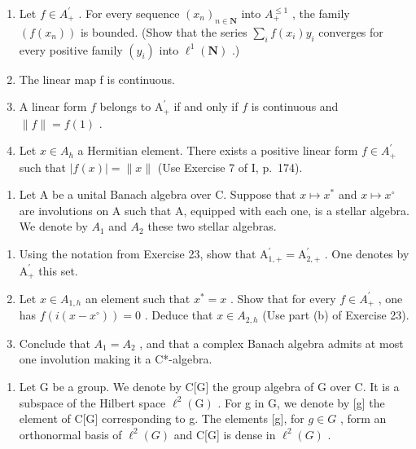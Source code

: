 \begin{enumerate}
\def\labelenumi{\alph{enumi})}
\item
  Let \(f \in A_{+}^{\prime}\) . For every sequence \((x_{n})_{n \in \mathbf{N}}\) into \(A_{+}^{\leqslant 1}\) , the family \((f(x_{n}))\) is bounded. (Show that the series \(\sum_{i} f(x_{i})y_{i}\) converges for every positive family \((y_{i})\) into \(\ell^{1}(\mathbf{N})\) .)
\item
  The linear map f is continuous.
\item
  A linear form \(f\) belongs to \(\mathrm{A}_{+}^{\prime}\) if and only if \(f\) is continuous and \(\| f \| = f(1)\) .
\item
  Let \(x \in A_{h}\) a Hermitian element. There exists a positive linear form \(f \in A_{+}^{\prime}\) such that \(|f(x)| = \|x\|\) (Use Exercise 7 of I, p.~174).
\end{enumerate}

\begin{enumerate}
\def\labelenumi{\arabic{enumi})}
\setcounter{enumi}{23}
\tightlist
\item
  Let A be a unital Banach algebra over C. Suppose that \(x \mapsto x^{*}\) and \(x \mapsto x^{\circ}\) are involutions on A such that A, equipped with each one, is a stellar algebra. We denote by \(A_{1}\) and \(A_{2}\) these two stellar algebras.
\end{enumerate}

\begin{enumerate}
\def\labelenumi{\alph{enumi})}
\item
  Using the notation from Exercise 23, show that \(\mathrm{A}_{1,+}^{\prime} = \mathrm{A}_{2,+}^{\prime}\) . One denotes by \(\mathrm{A}_{+}^{\prime}\) this set.
\item
  Let \(x \in A_{1,h}\) an element such that \(x^{*} = x\) . Show that for every \(f \in A_{+}^{\prime}\) , one has \(f(i(x - x^{\circ})) = 0\) . Deduce that \(x \in A_{2,h}\) (Use part (b) of Exercise 23).
\item
  Conclude that \(A_{1} = A_{2}\) , and that a complex Banach algebra admits at most one involution making it a C*-algebra.
\end{enumerate}

\begin{enumerate}
\def\labelenumi{\arabic{enumi})}
\setcounter{enumi}{24}
\tightlist
\item
  Let G be a group. We denote by C{[}G{]} the group algebra of G over C. It is a subspace of the Hilbert space \(\ell^{2}(\mathrm{G})\) . For g in G, we denote by {[}g{]} the element of C{[}G{]} corresponding to g. The elements {[}g{]}, for \(g \in G\) , form an orthonormal basis of \(\ell^{2}(G)\) and C{[}G{]} is dense in \(\ell^{2}(G)\) .
\end{enumerate}


